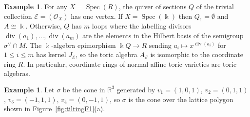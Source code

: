\documentclass[11pt,a4paper]{amsart}
\numberwithin{equation}{section}
\theoremstyle{definition}
\newtheorem{example}[theorem]{Example}
\theoremstyle{remark}
\newcommand{\kk}{\ensuremath{\Bbbk}}
\newcommand{\RR}{\ensuremath{\mathbb{R}}}
\renewcommand{\div}{\operatorname{div}}
\newcommand{\Spec}{\operatorname{Spec}}
\begin{document}
\begin{example}
For any $X=\Spec(R)$, the quiver of sections $Q$ of the trivial collection $\mathscr{E} = (\mathcal{O}_X)$ has one vertex. If $X=\Spec(\kk)$ then $Q_1=\emptyset$ and $A\cong \kk$. Otherwise, $Q$ has $m$ loops where the labelling divisors $\div(a_1),\dots,\div(a_m)$ are the elements in the Hilbert basis of the semigroup $\sigma^\vee\cap M$. The $\kk$-algebra epimorphism $\kk Q\to R$ sending $a_i\mapsto x^{\div(a_i)}$ for $1\leq i\leq m$ has kernel $J_{\mathscr{E}}$, so the toric algebra $A_{\mathscr{E}}$ is isomorphic to the coordinate ring $R$. In particular, coordinate rings of normal affine toric varieties are toric algebras. 
\end{example}

\begin{example}
\label{exa:F1tilting}
Let $\sigma$ be the cone in $\RR^3$ generated by $v_1=(1,0,1)$, $v_2= (0,1,1)$, $v_3= (-1,1,1)$, $v_4= (0,-1,1)$, so $\sigma$ is the cone over the lattice polygon shown in Figure~\ref{fig:tiltingF1}(a). 
   \begin{figure}[!ht]
    \centering
      \qquad  \qquad
\end{figure}
\end{example}
\end{document}
